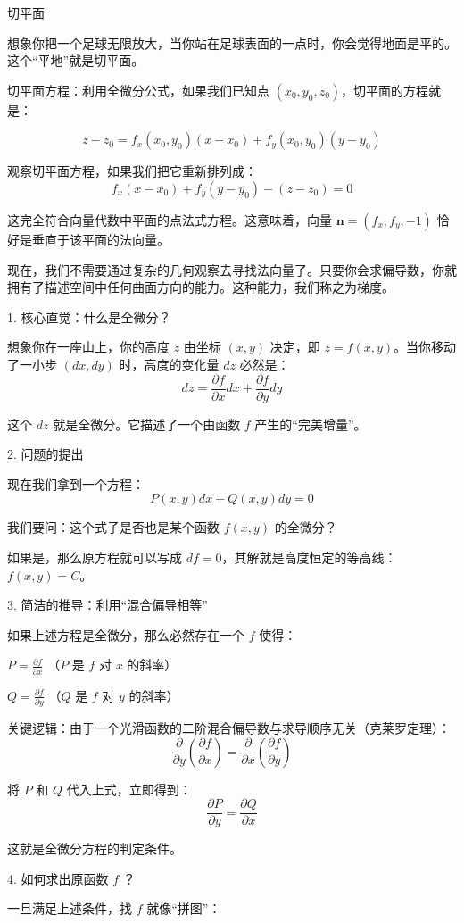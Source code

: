 切平面

想象你把一个足球无限放大，当你站在足球表面的一点时，你会觉得地面是平的。这个“平地”就是切平面。

切平面方程：利用全微分公式，如果我们已知点 $(x_0, y_0, z_0)$，切平面的方程就是：

$$z - z_0 = f_x(x_0, y_0)(x - x_0) + f_y(x_0, y_0)(y - y_0)$$

观察切平面方程，如果我们把它重新排列成：
$$f_x(x - x_0) + f_y(y - y_0) - (z - z_0) = 0$$

这完全符合向量代数中平面的点法式方程。这意味着，向量 $\mathbf{n} = (f_x, f_y, -1)$ 恰好是垂直于该平面的法向量。

现在，我们不需要通过复杂的几何观察去寻找法向量了。只要你会求偏导数，你就拥有了描述空间中任何曲面方向的能力。这种能力，我们称之为梯度。

1. 核心直觉：什么是全微分？

想象你在一座山上，你的高度 $z$ 由坐标 $(x, y)$ 决定，即 $z = f(x, y)$。当你移动了一小步 $(dx, dy)$ 时，高度的变化量 $dz$ 必然是：
$$dz = \frac{\partial f}{\partial x}dx + \frac{\partial f}{\partial y}dy$$

这个 $dz$ 就是全微分。它描述了一个由函数 $f$ 产生的“完美增量”。

2. 问题的提出

现在我们拿到一个方程：
$$P(x, y)dx + Q(x, y)dy = 0$$

我们要问：这个式子是否也是某个函数 $f(x, y)$ 的全微分？

如果是，那么原方程就可以写成 $df = 0$，其解就是高度恒定的等高线：$f(x, y) = C$。

3. 简洁的推导：利用“混合偏导相等”

如果上述方程是全微分，那么必然存在一个 $f$ 使得：

$P = \frac{\partial f}{\partial x}$ （$P$ 是 $f$ 对 $x$ 的斜率）

$Q = \frac{\partial f}{\partial y}$ （$Q$ 是 $f$ 对 $y$ 的斜率）

关键逻辑：由于一个光滑函数的二阶混合偏导数与求导顺序无关（克莱罗定理）：
$$\frac{\partial}{\partial y}\left( \frac{\partial f}{\partial x} \right) = \frac{\partial}{\partial x}\left( \frac{\partial f}{\partial y} \right)$$

将 $P$ 和 $Q$ 代入上式，立即得到：
$$\frac{\partial P}{\partial y} = \frac{\partial Q}{\partial x}$$

这就是全微分方程的判定条件。

4. 如何求出原函数 $f$ ？

一旦满足上述条件，找 $f$ 就像“拼图”：

